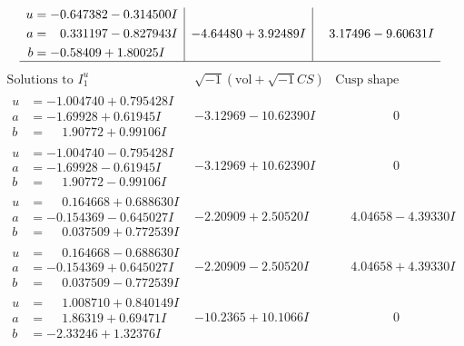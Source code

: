 \documentclass[1p]{elsarticle_modified}
\theoremstyle{definition}
\newcommand{\I}{\sqrt{-1}}
\begin{document}
$$\begin{array}{c|c|c}
\begin{aligned}
u &= -0.647382 - 0.314500 I \\
a &= \phantom{-}0.331197 - 0.827943 I \\
b &= -0.58409 + 1.80025 I\end{aligned}
 & -4.64480 + 3.92489 I & \phantom{-}3.17496 - 9.60631 I\\
 \hline 
 \end{array}$$\newpage$$\begin{array}{c|c|c}  
\text{Solutions to }I^u_{1}& \I (\text{vol} + \sqrt{-1}CS) & \text{Cusp shape}\\
 \hline 
\begin{aligned}
u &= -1.004740 + 0.795428 I \\
a &= -1.69928 + 0.61945 I \\
b &= \phantom{-}1.90772 + 0.99106 I\end{aligned}
 & -3.12969 - 10.62390 I & \phantom{-0.000000 } 0 \\ \hline\begin{aligned}
u &= -1.004740 - 0.795428 I \\
a &= -1.69928 - 0.61945 I \\
b &= \phantom{-}1.90772 - 0.99106 I\end{aligned}
 & -3.12969 + 10.62390 I & \phantom{-0.000000 } 0 \\ \hline\begin{aligned}
u &= \phantom{-}0.164668 + 0.688630 I \\
a &= -0.154369 - 0.645027 I \\
b &= \phantom{-}0.037509 + 0.772539 I\end{aligned}
 & -2.20909 + 2.50520 I & \phantom{-}4.04658 - 4.39330 I \\ \hline\begin{aligned}
u &= \phantom{-}0.164668 - 0.688630 I \\
a &= -0.154369 + 0.645027 I \\
b &= \phantom{-}0.037509 - 0.772539 I\end{aligned}
 & -2.20909 - 2.50520 I & \phantom{-}4.04658 + 4.39330 I \\ \hline\begin{aligned}
u &= \phantom{-}1.008710 + 0.840149 I \\
a &= \phantom{-}1.86319 + 0.69471 I \\
b &= -2.33246 + 1.32376 I\end{aligned}
 & -10.2365 + 10.1066 I & \phantom{-0.000000 } 0 \\ \hline\begin{aligned}

\end{aligned}
\end{array}$$
\end{document}
